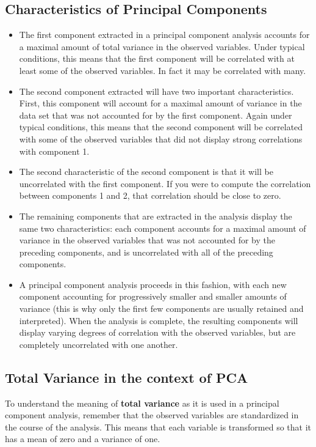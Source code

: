 \subsection{Characteristics of Principal Components}
\begin{itemize}
	\item The first component extracted in a principal component analysis accounts for a maximal amount of total variance in the observed variables. Under typical conditions, this means that the first component will be correlated with at least
	some of the observed variables.  In fact it may be correlated with many.
	
\item The second component extracted will have two important characteristics.  First,  this component
	will account for a maximal amount of variance in the data set that was not accounted for by the
	first component.  Again under typical conditions, this means that the second component will be
	correlated with some of the observed variables that did not display strong correlations with
	component 1.
\item The second characteristic of the second component is that it will be uncorrelated with the first
	component. If you were to compute the correlation between components 1 and 2, that
	correlation should be close to zero.
	
\item The remaining components that are extracted in the analysis display the same two characteristics:
	each component accounts for a maximal amount of variance in the observed variables that was
	not accounted for by the preceding components, and is uncorrelated with all of the preceding
	components.  
	\item A principal component analysis proceeds in this fashion, with each new component
	accounting for progressively smaller and smaller amounts of variance (this is why only the first
	few components are usually retained and interpreted).  When the analysis is complete, the
	resulting components will display varying degrees of correlation with the observed variables, but
	are completely uncorrelated with one another.
\end{itemize}


\subsection{Total Variance in the context of PCA}
To understand the meaning of \textbf{total
	variance} as it is used in a principal component analysis, remember that the observed
variables are standardized in the course of the analysis.  This means that each variable is
transformed so that it has a mean of zero and a variance of one.

